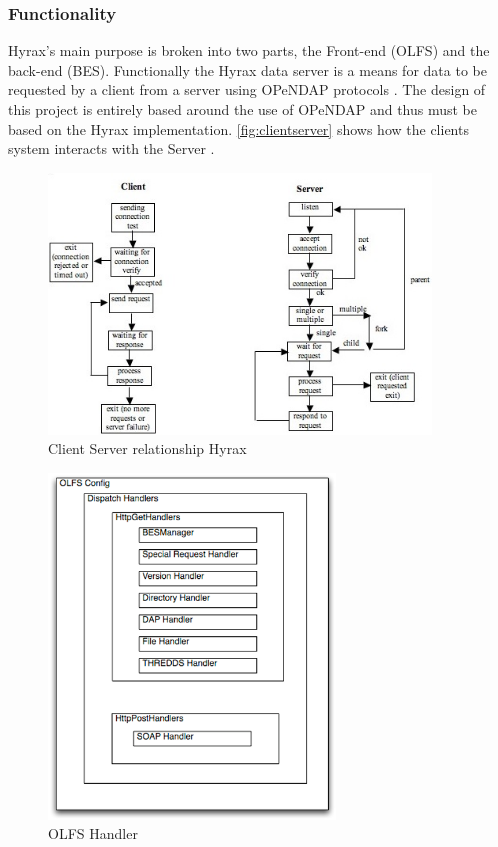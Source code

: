 \documentclass[onecolumn, draftclsnofoot,10pt, compsoc]{IEEEtran}
\begin{document}
\subsubsection{Functionality}
Hyrax's main purpose is broken into two parts, the \gls{Front-end} (OLFS) and the \gls{back-end} (BES). Functionally the Hyrax data server is a means for data to be requested by a client from a server using OPeNDAP protocols \cite{Hyrax}. The design of this project is entirely based around the use of OPeNDAP and thus must be based on the Hyrax implementation. \autoref{fig:clientserver} shows how the clients system interacts with the Server \cite{clientserver}.
\begin{figure}[H]
    \centering
    \includegraphics[width=4in,scale=1.0]{Hyrax_state_diagram.jpg}
    \caption{Client Server relationship Hyrax}
    \label{fig:clientserver}
\end{figure}

\begin{figure}[H]
    \centering
    \includegraphics[width=3in,scale=1.0]{handler.png}
    \caption{OLFS Handler}
    \label{fig:handlerolfs}
\end{figure}
\end{document}
